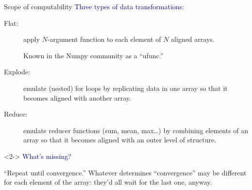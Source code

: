 \documentclass{beamer}
\begin{document}

\begin{frame}{Scope of computability}
\vspace{0.5 cm}
\textcolor{darkblue}{Three types of data transformations:}
\begin{description}
\item[Flat:] apply $N$-argument function to each element of $N$ aligned arrays.

\vspace{0.2 cm}
Known in the Numpy community as a ``ufunc.''

\item[Explode:] emulate (nested) for loops by replicating data in one array so that it becomes aligned with another array.

\item[Reduce:] emulate reducer functions (sum, mean, max\ldots) by combining elements of an array so that it becomes aligned with an outer level of structure.
\end{description}

\vfill
\begin{uncoverenv}<2->
\textcolor{darkblue}{What's missing?}

\vspace{0.2 cm}
``Repeat until convergence.'' Whatever determines ``convergence'' may be different for each element of the array: they'd all wait for the last one, anyway.
\end{uncoverenv}
\end{frame}
\end{document}
